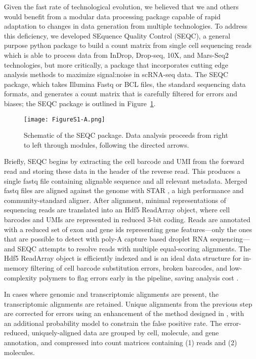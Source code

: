 Given the fast rate of technological evolution, we believed that we and others would benefit from a modular data processing package capable of rapid adaptation to changes in data generation from multiple technologies.
To address this deficiency, we developed SEquence Quality Control (SEQC), a general purpose python package to build a count matrix from single cell sequencing reads which is able to process data from InDrop, Drop-seq, 10X, and Mars-Seq2 technologies, but more critically, a package that incorporates cutting edge analysis methods to maximize signal:noise in scRNA-seq data. 
The SEQC package, which takes Illumina Fastq or BCL files, the standard sequencing data formats, and generates a count matrix that is carefully filtered for errors and biases; the SEQC package is outlined in Figure~\ref{fig:s1a}. 

\begin{figure}
\centering
\texttt{[image: FigureS1-A.png]}
\caption{Schematic of the SEQC package. Data analysis proceeds from right to left through modules, following the directed arrows.}
\label{fig:s1a}
\end{figure} 

Briefly, SEQC begins by extracting the cell barcode and UMI from the forward read and storing these data in the header of the reverse read.
This produces a single fastq file containing alignable sequence and all relevant metadata.
Merged fastq files are aligned against the genome with STAR \citep{Dobin2013}, a high performance and community-standard aligner. 
After alignment, minimal representations of sequencing reads are translated into an Hdf5 {\mono ReadArray} object, where cell barcodes and UMIs are represented in reduced 3-bit coding. 
Reads are annotated with a reduced set of exon and gene ids representing gene features---only the ones that are possible to detect with poly-A capture based droplet RNA sequencing---and SEQC attempts to resolve reads with multiple equal-scoring alignments.
The Hdf5 {\mono ReadArray} object is efficiently indexed and is an ideal data structure for in-memory filtering of cell barcode substitution errors, broken barcodes, and low-complexity polymers to flag errors early in the pipeline, saving analysis cost \citep{Alted2002}.

In cases where genomic and transcriptomic alignments are present, the transcriptomic alignments are retained. 
Unique alignments from the previous step are corrected for errors using an enhancement of the method designed in \cite{Jaitin2014}, with an additional probability model to constrain the false positive rate.
The error-reduced, uniquely-aligned data are grouped by cell, molecule, and gene annotation, and compressed into count matrices containing (1) reads and (2) molecules. 

